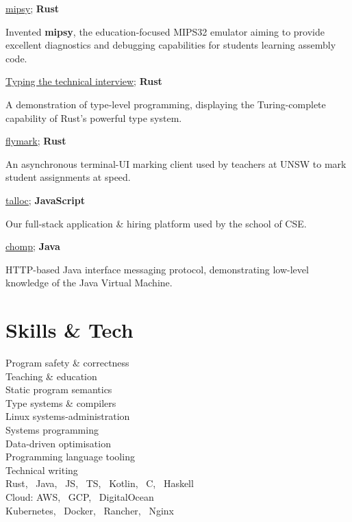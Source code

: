 \documentclass[a4paper]{deedy-resume}
\begin{document}
\begin{minipage}[t]{0.35\textwidth}
\href{https://github.com/insou22/mipsy}
	{\underline{mipsy}}; \textbf{ Rust}

Invented \textbf{mipsy}, the education-focused
MIPS32 emulator aiming to provide excellent
diagnostics and debugging capabilities for
students learning assembly code.

\vspace{6pt}

\href{https://github.com/insou22/typing-the-technical-interview-rust}
	{\underline{Typing the technical interview}}; \textbf{Rust}

A demonstration of type-level programming,
displaying the Turing-complete capability
of Rust's powerful type system.

\vspace{6pt}

\href{https://github.com/insou22/flymark}
	{\underline{flymark}}; \textbf{ Rust}

An asynchronous terminal-UI marking client
used by teachers at UNSW to mark student
assignments at speed.

\vspace{6pt}

\href{https://cgi.cse.unsw.edu.au/~talloc/}
	{\underline{talloc}}; \textbf{ JavaScript}

Our full-stack application \& hiring platform
used by the school of CSE.

\vspace{6pt}

\href{https://github.com/insou22/chomp}
	{\underline{chomp}}; \textbf{ Java}

HTTP-based Java interface messaging protocol,
demonstrating low-level knowledge of the Java 
Virtual Machine.

\sectionspace
\section{Skills \& Tech}

Program safety \& correctness \\
Teaching \& education \\
Static program semantics \\
Type systems \& compilers \\
Linux systems-administration \\
Systems programming \\
Data-driven optimisation \\
Programming language tooling \\
Technical writing \\
Rust, \ Java, \ JS, \ TS, \ Kotlin, \ C, \ Haskell \\
Cloud: AWS, \ GCP, \ DigitalOcean \\
Kubernetes, \ Docker, \ Rancher, \ Nginx



\end{minipage}
\end{document}
